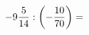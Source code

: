 \documentclass[preview]{standalone}
\begin{document}
\begin{align*}
-9 { 5 \over 14 }  :  \left( - { 10 \over 70 } \right)  =
\end{align*}
\end{document}

